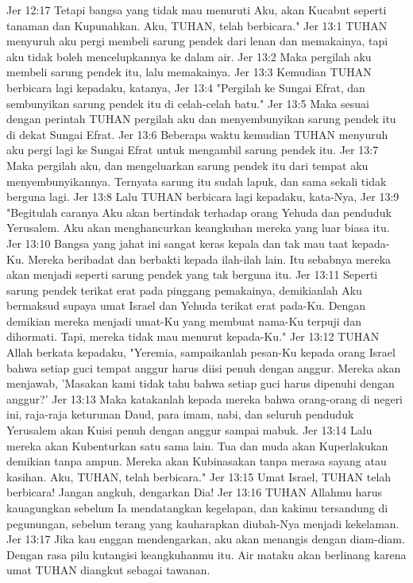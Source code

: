 Jer 12:17  Tetapi bangsa yang tidak mau menuruti Aku, akan Kucabut seperti tanaman dan Kupunahkan. Aku, TUHAN, telah berbicara."
Jer 13:1  TUHAN menyuruh aku pergi membeli sarung pendek dari lenan dan memakainya, tapi aku tidak boleh mencelupkannya ke dalam air.
Jer 13:2  Maka pergilah aku membeli sarung pendek itu, lalu memakainya.
Jer 13:3  Kemudian TUHAN berbicara lagi kepadaku, katanya,
Jer 13:4  "Pergilah ke Sungai Efrat, dan sembunyikan sarung pendek itu di celah-celah batu."
Jer 13:5  Maka sesuai dengan perintah TUHAN pergilah aku dan menyembunyikan sarung pendek itu di dekat Sungai Efrat.
Jer 13:6  Beberapa waktu kemudian TUHAN menyuruh aku pergi lagi ke Sungai Efrat untuk mengambil sarung pendek itu.
Jer 13:7  Maka pergilah aku, dan mengeluarkan sarung pendek itu dari tempat aku menyembunyikannya. Ternyata sarung itu sudah lapuk, dan sama sekali tidak berguna lagi.
Jer 13:8  Lalu TUHAN berbicara lagi kepadaku, kata-Nya,
Jer 13:9  "Begitulah caranya Aku akan bertindak terhadap orang Yehuda dan penduduk Yerusalem. Aku akan menghancurkan keangkuhan mereka yang luar biasa itu.
Jer 13:10  Bangsa yang jahat ini sangat keras kepala dan tak mau taat kepada-Ku. Mereka beribadat dan berbakti kepada ilah-ilah lain. Itu sebabnya mereka akan menjadi seperti sarung pendek yang tak berguna itu.
Jer 13:11  Seperti sarung pendek terikat erat pada pinggang pemakainya, demikianlah Aku bermaksud supaya umat Israel dan Yehuda terikat erat pada-Ku. Dengan demikian mereka menjadi umat-Ku yang membuat nama-Ku terpuji dan dihormati. Tapi, mereka tidak mau menurut kepada-Ku."
Jer 13:12  TUHAN Allah berkata kepadaku, "Yeremia, sampaikanlah pesan-Ku kepada orang Israel bahwa setiap guci tempat anggur harus diisi penuh dengan anggur. Mereka akan menjawab, 'Masakan kami tidak tahu bahwa setiap guci harus dipenuhi dengan anggur?'
Jer 13:13  Maka katakanlah kepada mereka bahwa orang-orang di negeri ini, raja-raja keturunan Daud, para imam, nabi, dan seluruh penduduk Yerusalem akan Kuisi penuh dengan anggur sampai mabuk.
Jer 13:14  Lalu mereka akan Kubenturkan satu sama lain. Tua dan muda akan Kuperlakukan demikian tanpa ampun. Mereka akan Kubinasakan tanpa merasa sayang atau kasihan. Aku, TUHAN, telah berbicara."
Jer 13:15  Umat Israel, TUHAN telah berbicara! Jangan angkuh, dengarkan Dia!
Jer 13:16  TUHAN Allahmu harus kauagungkan sebelum Ia mendatangkan kegelapan, dan kakimu tersandung di pegunungan, sebelum terang yang kauharapkan diubah-Nya menjadi kekelaman.
Jer 13:17  Jika kau enggan mendengarkan, aku akan menangis dengan diam-diam. Dengan rasa pilu kutangisi keangkuhanmu itu. Air mataku akan berlinang karena umat TUHAN diangkut sebagai tawanan.
